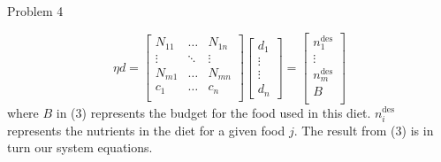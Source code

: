 \begin{problem}{Problem 4}
\begin{Highlight}[Solution]
        \begin{equation}
            \eta d = 
            \begin{bmatrix}
                N_{11} & \dots & N_{1n} \\
                \vdots & \ddots & \vdots \\
                N_{m1} & \dots & N_{mn} \\
                c_{1} & \dots & c_{n} \\
            \end{bmatrix}
            \begin{bmatrix}
                d_{1} \\
                \vdots \\
                \vdots \\
                d_{n}
            \end{bmatrix}
            = 
            \begin{bmatrix}
                n_{1}^{\text{des}} \\
                \vdots \\
                n_{m}^{\text{des}} \\
                B \\
            \end{bmatrix}
        \end{equation}
        where $B$ in (3) represents the budget for the food used in this diet. $n_{i}^{\text{des}}$ represents the nutrients in the diet for a given food $j$. The result from (3) is in turn our system
        equations.
    \end{Highlight}
\end{problem}

